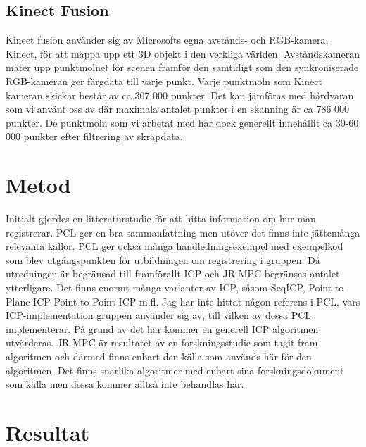 \subsection{Kinect Fusion}

Kinect fusion använder sig av Microsofts egna avstånds- och RGB-kamera, Kinect, för att mappa upp ett 3D objekt i den verkliga världen. Avståndskameran mäter upp punktmolnet för scenen framför den samtidigt som den synkroniserade RGB-kameran ger färgdata till varje punkt. 
Varje punktmoln som Kinect kameran skickar består av ca 307 000 punkter. Det kan jämföras med hårdvaran som vi använt oss av där maximala antalet punkter i en skanning är ca 786 000 punkter. De punktmoln som vi arbetat med har dock generellt innehållit ca 30-60 000 punkter efter filtrering av skräpdata.

\section{Metod}
\label{sec:method-karlsson}

Initialt gjordes en litteraturstudie för att hitta information om hur man registrerar.  PCL ger en bra sammanfattning men utöver det finns inte jättemånga relevanta källor. PCL ger också många handledningsexempel med exempelkod som blev utgångspunkten för utbildningen om registrering i gruppen. Då utredningen är begränsad till framförallt ICP och JR-MPC begränsas antalet ytterligare. Det finns enormt många varianter av ICP, såsom SeqICP, Point-to-Plane ICP Point-to-Point ICP m.fl. Jag har inte hittat någon referens i PCL, vars ICP-implementation gruppen använder sig av, till vilken av dessa PCL implementerar. På grund av det här kommer en generell ICP algoritmen utvärderas. JR-MPC är resultatet av en forskningsstudie som tagit fram algoritmen och därmed finns enbart den källa som används här för den algoritmen. Det finns snarlika algoritmer med enbart sina forskningsdokument som källa men dessa kommer alltså inte behandlas här.



\section{Resultat}
\label{sec:results-karlsson}

